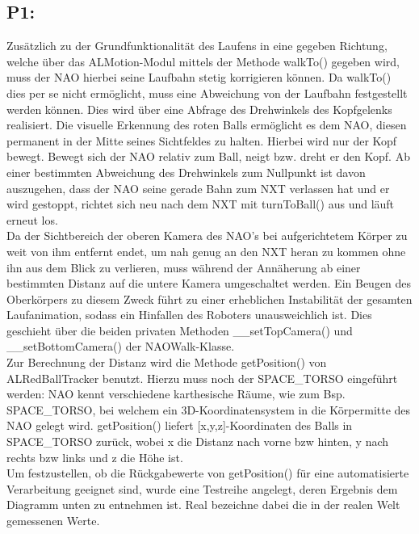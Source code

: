 \subsection*{P1:}
Zusätzlich zu der Grundfunktionalität des Laufens in eine gegeben Richtung, welche über das ALMotion-Modul mittels der Methode walkTo()  gegeben wird, muss der NAO hierbei seine Laufbahn stetig korrigieren können. Da walkTo() dies per se nicht ermöglicht, muss eine Abweichung von der Laufbahn festgestellt werden können. Dies wird über eine Abfrage des Drehwinkels des Kopfgelenks realisiert. Die visuelle Erkennung des roten Balls ermöglicht es dem NAO, diesen permanent in der Mitte seines Sichtfeldes zu halten. Hierbei wird nur der Kopf bewegt. Bewegt sich der NAO relativ zum Ball, neigt bzw. dreht er den Kopf. Ab einer bestimmten Abweichung des Drehwinkels zum Nullpunkt ist davon auszugehen, dass der NAO seine gerade Bahn zum NXT verlassen hat und er wird gestoppt, richtet sich neu nach dem NXT mit turnToBall() aus und läuft erneut los.
\\
Da der Sichtbereich der oberen Kamera des NAO's bei aufgerichtetem Körper zu weit von ihm entfernt endet, um nah genug an den NXT heran zu kommen ohne ihn aus dem Blick zu verlieren, muss während der Annäherung ab einer bestimmten Distanz auf die untere Kamera umgeschaltet werden. Ein Beugen des Oberkörpers zu diesem Zweck führt zu einer erheblichen Instabilität der gesamten Laufanimation, sodass ein Hinfallen des Roboters unausweichlich ist. Dies geschieht über die beiden privaten Methoden \_\_setTopCamera() und \_\_setBottomCamera() der NAOWalk-Klasse.
\\
Zur Berechnung der Distanz wird die Methode getPosition() von ALRedBallTracker benutzt. 
Hierzu muss noch der SPACE\_TORSO eingeführt werden: 
NAO kennt verschiedene karthesische Räume, wie zum Bsp. SPACE\_TORSO, bei welchem ein 3D-Koordinatensystem in die Körpermitte des NAO gelegt wird. 
getPosition() liefert [x,y,z]-Koordinaten des Balls in SPACE\_TORSO zurück, wobei x die Distanz nach vorne bzw hinten, y nach rechts bzw links und z die Höhe ist. 
\\
Um festzustellen, ob die Rückgabewerte von getPosition() für eine automatisierte  Verarbeitung geeignet sind, wurde eine Testreihe angelegt, deren Ergebnis dem Diagramm unten zu entnehmen ist. Real bezeichne dabei die in der realen Welt gemessenen Werte.

